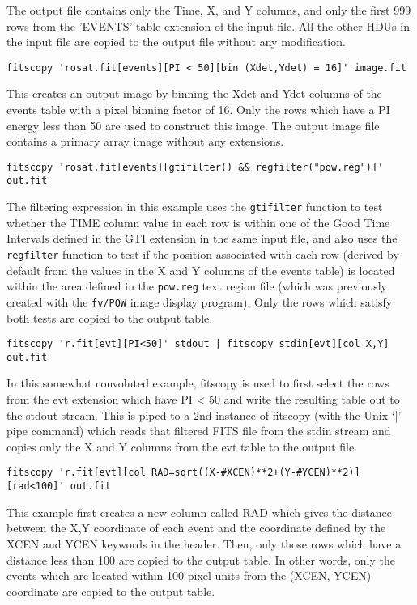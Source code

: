 \documentclass[11pt]{article}
\begin{document}
The output file contains only the Time, X, and Y columns, and only
the first 999 rows from the 'EVENTS' table extension of the input file.
All the other HDUs in the input file are copied to the output file
without any modification.

\begin{verbatim}
fitscopy 'rosat.fit[events][PI < 50][bin (Xdet,Ydet) = 16]' image.fit
\end{verbatim}

This creates an output image by binning the Xdet and Ydet columns of
the events table with a pixel binning factor of 16.  Only the rows
which have a PI energy less than 50 are used to construct this image.
The output image file contains a primary array image without any
extensions.

\begin{verbatim}
fitscopy 'rosat.fit[events][gtifilter() && regfilter("pow.reg")]' out.fit
\end{verbatim}

The filtering expression in this example uses the {\tt gtifilter}
function to test whether the TIME column value in each row is within
one of the Good Time Intervals defined in the GTI extension in the same
input file, and also uses the {\tt regfilter} function to test if the
position associated with each row (derived by default from the values
in the X and Y columns of the events table) is located within the area
defined in the {\tt pow.reg} text region file (which was previously
created with the {\tt fv/POW} image display program).  Only the rows
which satisfy both tests are copied to the output table.

\begin{verbatim}
fitscopy 'r.fit[evt][PI<50]' stdout | fitscopy stdin[evt][col X,Y] out.fit
\end{verbatim}

In this somewhat convoluted example, fitscopy is used to first select
the rows from the evt extension which have PI < 50 and write the
resulting table out to the stdout stream.  This is piped to a 2nd
instance of fitscopy (with the Unix `|' pipe command) which reads that
filtered FITS file from the stdin stream and copies only the X and Y
columns from the evt table to the output file.

\begin{verbatim}
fitscopy 'r.fit[evt][col RAD=sqrt((X-#XCEN)**2+(Y-#YCEN)**2)][rad<100]' out.fit
\end{verbatim}

This example first creates a new column called RAD which gives the
distance between the X,Y coordinate of each event and the coordinate
defined by the XCEN and YCEN keywords in the header.  Then, only those
rows which have a distance less than 100 are copied to the output
table.  In other words, only the events which are located within 100
pixel units from the (XCEN, YCEN) coordinate are copied to the output
table.
\end{document}

